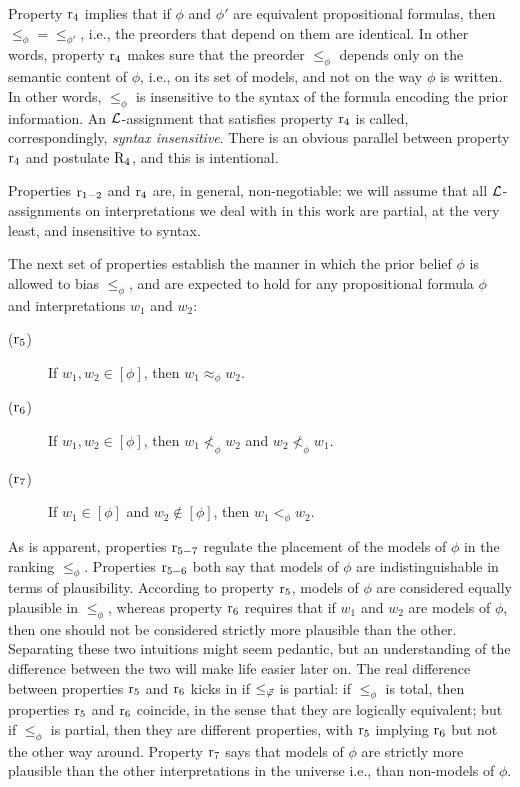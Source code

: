 Property $\oor{4}$ implies that 
if $\phi$ and $\phi'$
are equivalent propositional formulas,
then $\le_\phi=\le_{\phi'}$,
i.e., the preorders that depend on them are 
identical.
In other words, property $\oor{4}$ makes sure that the preorder $\le_\phi$ 
depends only on the semantic content of $\phi$,
i.e., on its set of models, and not on the way $\phi$ is written.
In other words, $\le_\phi$ is insensitive to the syntax 
of the formula encoding the prior information.
An $\L$-assignment that satisfies property $\oor{4}$
is called, correspondingly, \emph{syntax insensitive}.
There is an obvious parallel between property $\oor{4}$
and postulate $\ppr{4}$, and this is intentional.

Properties $\oor{1-2}$ and $\oor{4}$ are, in general, 
non-negotiable: we will assume that all $\L$-assignments 
on interpretations we deal with in this work are partial, 
at the very least, and insensitive to syntax.

The next set of properties establish the manner
in which the prior belief $\phi$ is allowed to bias $\le_\phi$,
and are expected to hold
for any propositional formula $\phi$
and interpretations $w_1$ and $w_2$:

\begin{description}
	\item[($\oor{5}$)] If $w_1,w_2\in[\phi]$, then $w_1\approx_\phi w_2$.
	\item[($\oor{6}$)] If $w_1,w_2\in[\phi]$, then $w_1\not<_\phi w_2$ and $w_2\not<_\phi w_1$.
	\item[($\oor{7}$)] If $w_1\in [\phi]$ and $w_2\notin [\phi]$, then $w_1 <_\phi w_2$.
\end{description}

As is apparent, properties $\oor{5-7}$ regulate the placement of
the models of $\phi$ in the ranking $\le_\phi$.
Properties $\oor{5-6}$ both say that models of $\phi$ are indistinguishable
in terms of plausibility.
According to property $\oor{5}$, models of $\phi$ are considered 
equally plausible in $\le_\phi$,
whereas property $\oor{6}$ requires that if $w_1$ and $w_2$ are models of $\phi$, 
then one should not be considered
strictly more plausible than the other.
Separating these two intuitions might seem pedantic, but
an understanding of the difference between the two will make
life easier later on.
The real difference between properties $\oor{5}$ and $\oor{6}$ 
kicks in if $\le_{\P}$ is partial: 
if $\le_{\phi}$ is total, then properties $\oor{5}$ and $\oor{6}$ coincide,
in the sense that they are logically equivalent; but if $\le_{\phi}$ is partial, 
then they are different properties, with $\oor{5}$ implying $\oor{6}$ but not
the other way around.
Property $\oor{7}$ says that models of $\phi$ are strictly more plausible 
than the other interpretations in the universe i.e., than non-models of $\phi$.

